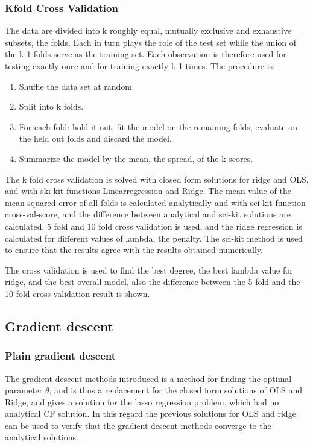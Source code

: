 \documentclass[aps,rmp,reprint,amsmath,amssymb,longbibliography]{revtex4-1}
\let\label\ReportKernelLabel
\begin{document}
\subsubsection{Kfold Cross Validation}
The data are divided into k roughly equal, mutually exclusive and
exhaustive subsets, the folds. Each in turn plays the role of the
test set while the union of the k-1 folds serve as the training set.
Each observation is therefore used for testing exactly once and for
training exactly k-1 times. The procedure is:
\begin{enumerate}
  \item Shuffle the data set at random
  \item Split into k folds.
  \item For each fold: hold it out, fit the model on the remaining folds,
  evaluate on the held out folds and discard the model.
  \item Summarize the model by the mean, the spread, of the k scores.
\end{enumerate}
\cite[p.~66]{LectureNotes}
The k fold cross validation is solved with closed form solutions
for ridge and OLS, and with ski-kit functions Linearregression and Ridge.
The mean value of the mean squared error of all folds is calculated analytically
and with sci-kit function cross-val-score, and the difference between analytical and
sci-kit solutions are calculated. 5 fold and 10 fold cross validation is used,
and the ridge regression is calculated for different values of lambda, the penalty.
The sci-kit method is used to ensure that the results agree with the results obtained
numerically.

The cross validation is used to find the best degree, the best lambda value for ridge,
and the best overall model, also the difference between the 5 fold and the 10 fold
cross validation result is shown.

\subsection{Gradient descent}
\label{sec:GD}
\subsubsection{Plain gradient descent}
The gradient descent methods introduced is a method for finding
the optimal parameter $\theta$, and is thus a replacement for
the closed form solutions of OLS and Ridge, and gives a solution
for the lasso regression problem, which had no analytical CF solution.
In this regard the previous solutions for OLS and ridge can be used
to verify that the gradient descent methods converge to the analytical solutions.
\end{document}
